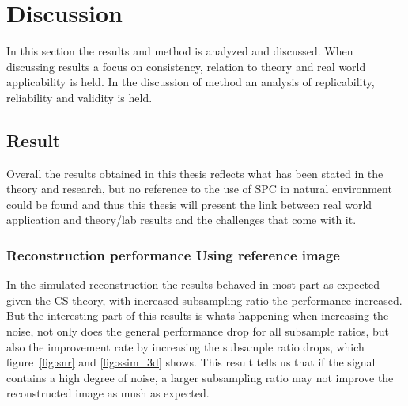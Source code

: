\section{Discussion} %
In this section the results and method is analyzed and discussed. When discussing results a focus on consistency, relation to theory and real world applicability is held. In the discussion of method an analysis of replicability, reliability and  validity is held.

\subsection{Result} 
Overall the results obtained in this thesis reflects what has been stated in the theory and research, but no reference to the use of SPC in natural environment could be found and thus this thesis will present the link between real world application and theory/lab results and the challenges that come with it. 



\subsubsection{Reconstruction performance Using reference image}
In the simulated reconstruction the results behaved in most part as expected given the CS theory, with increased subsampling ratio the performance increased. But the interesting part of this results is whats happening when increasing the noise, not only does the general performance drop for all subsample ratios, but also the improvement rate by increasing the subsample ratio drops, which figure~\ref{fig:snr} and \ref{fig:ssim_3d} shows. This result tells us that if the signal contains a high degree of noise, a larger subsampling ratio may not improve the reconstructed image as mush as expected.\\[0.1in]

